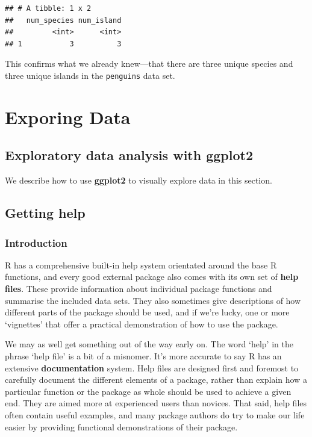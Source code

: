 \documentclass[
]{book}
\begin{document}
\begin{verbatim}
## # A tibble: 1 x 2
##   num_species num_island
##         <int>      <int>
## 1           3          3
\end{verbatim}

This confirms what we already knew---that there are three unique species and three unique islands in the \texttt{penguins} data set.

\hypertarget{part-exporing-data}{%
\part{Exporing Data}\label{part-exporing-data}}

\hypertarget{exploratory-data-analysis-with-ggplot2}{%
\chapter{\texorpdfstring{Exploratory data analysis with \textbf{ggplot2}}{Exploratory data analysis with ggplot2}}\label{exploratory-data-analysis-with-ggplot2}}

We describe how to use \textbf{ggplot2} to visually explore data in this section.

\hypertarget{appendix-supplementary-material}{%
\appendix}


\hypertarget{getting-help}{%
\chapter{Getting help}\label{getting-help}}

\hypertarget{console-help}{%
\section{Introduction}\label{console-help}}

R has a comprehensive built-in help system orientated around the base R functions, and every good external package also comes with its own set of \textbf{help files}. These provide information about individual package functions and summarise the included data sets. They also sometimes give descriptions of how different parts of the package should be used, and if we're lucky, one or more `vignettes' that offer a practical demonstration of how to use the package.

We may as well get something out of the way early on. The word `help' in the phrase `help file' is a bit of a misnomer. It's more accurate to say R has an extensive \textbf{documentation} system. Help files are designed first and foremost to carefully document the different elements of a package, rather than explain how a particular function or the package as whole should be used to achieve a given end. They are aimed more at experienced users than novices. That said, help files often contain useful examples, and many package authors do try to make our life easier by providing functional demonstrations of their package.
\end{document}
